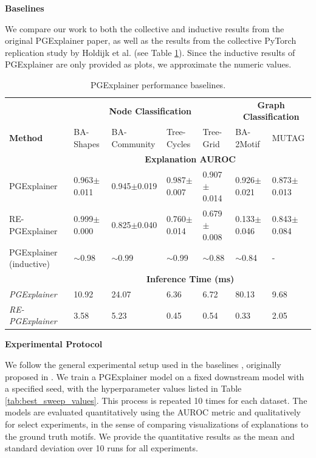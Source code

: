 \textbf{Baselines}\par
 We compare our work to both the collective and inductive results from the original PGExplainer paper, as well as the results from the collective PyTorch replication study by Holdijk et al. \cite{holdijk2021re} (see Table \ref{tab:pgexplainer_baseline}). Since the inductive results of PGExplainer are only provided as plots, we approximate the numeric values. \bigskip

\begin{table}[ht]
    \centering
    \scriptsize
    \begin{tabularx}{\textwidth}{lXXXX|XX}   %
    \textbf{} & \multicolumn{4}{c}{\textbf{Node Classification}} & \multicolumn{2}{c}{\textbf{Graph Classification}} \\
    \textbf{Method} & BA-Shapes & BA-Community & Tree-Cycles & Tree-Grid & BA-2Motif & MUTAG \\
    \midrule
    \addlinespace
    \textbf{} & \multicolumn{6}{c}{\textbf{Explanation AUROC}} \\
    \midrule
    PGExplainer & 0.963$\pm$0.011 & 0.945$\pm$0.019 & 0.987$\pm$0.007 & 0.907$\pm$0.014 & 0.926$\pm$0.021 & 0.873$\pm$0.013 \\
    \midrule
    RE-PGExplainer & 0.999$\pm$0.000 & 0.825$\pm$0.040 & 0.760$\pm$0.014 & 0.679$\pm$0.008 & 0.133$\pm$0.046 & 0.843$\pm$0.084 \\
    \midrule
    PGExplainer (inductive) & $\sim$0.98 & $\sim$0.99 & $\sim$0.99 & $\sim$0.88 & $\sim$0.84 & - \\
    \midrule
    \addlinespace
    \textbf{} & \multicolumn{6}{c}{\textbf{Inference Time (ms)}} \\
    \midrule
    \textit{PGExplainer} & 10.92 & 24.07 & 6.36 & 6.72 & 80.13 & 9.68 \\
    \textit{RE-PGExplainer} & 3.58 & 5.23 & 0.45 & 0.54 & 0.33 & 2.05 \\
    \bottomrule
    \end{tabularx}
    \caption[Baseline PGExplainer and RE-PGExplainer]{PGExplainer performance baselines.}
    \label{tab:pgexplainer_baseline}
\end{table}


\textbf{Experimental Protocol}\par
We follow the general experimental setup used in the baselines \cite{luo2020parameterized} \cite{holdijk2021re}, originally proposed in \cite{ying2019gnnexplainer}. We train a PGExplainer model on a fixed downstream model with a specified seed, with the hyperparameter values listed in Table \ref{tab:best_sweep_values}. This process is repeated 10 times for each dataset. The models are evaluated quantitatively using the AUROC metric and qualitatively for select experiments, in the sense of comparing visualizations of explanations to the ground truth motifs. We provide the quantitative results as the mean and standard deviation over 10 runs for all experiments. \bigskip



